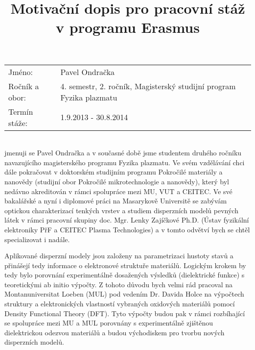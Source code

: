 \documentclass[12pt,a4paper,oneside,final]{article}
\title{Motivační dopis pro pracovní stáž v programu Erasmus}
\date{\vspace{-5ex}}
\begin{document}
\maketitle


\begin{tabular}{l l}
Jméno: & Pavel Ondračka\\
Ročník a obor: & 4. semestr, 2. ročník, Magisterský studijní program Fyzika plazmatu\\
Termín stáže: & 1.9.2013 - 30.8.2014\\
\end{tabular}

\vspace{1cm}
\\
jmenuji se Pavel Ondračka a v současné době jsme studentem druhého ročníku navazujícího magisterského programu Fyzika plazmatu. Ve svém vzdělávání chci dále pokračovat v doktorském studijním programu Pokročilé materiály a nanovědy (studijní obor Pokročilé mikrotechnologie a nanovědy), který byl nedávno akreditován v rámci spolupráce mezi MU, VUT a CEITEC. Ve své bakalářské a nyní i diplomové práci na Masarykově Universitě se zabývám optickou charakterizací tenkých vrstev a studiem disperzních modelů pevných látek v rámci pracovní skupiny doc. Mgr. Lenky Zajíčkové Ph.D. (Ústav fyzikální elektroniky PřF a CEITEC Plasma Technologies) a v tomto odvětví bych se chtěl specializovat i nadále. 

Aplikované disperzní modely jsou založeny na parametrizaci hustoty stavů a přinášejí tedy informace o elektronové struktuře materiálů. Logickým krokem by tedy bylo porovnání experimentálně dosažených výsledků (dielektrické funkce) s teoretickými ab initio výpočty. Z tohoto důvodu bych velmi rád pracoval na Montanuniversitat Loeben (MUL) pod vedením Dr. Davida Holce na výpočtech struktury a elektronických vlastností vybraných oxidových materiálů pomocí Density Functional Theory (DFT). Tyto výpočty budou pak v rámci rozbíhající se spolupráce mezi MU a MUL porovnány s experimentálně zjištěnou dielektrickou odezvou materiálů a budou východiskem pro tvorbu nových disperzních modelů.
\end{document}
